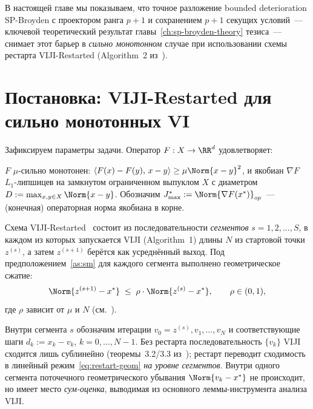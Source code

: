 В настоящей главе мы показываем, что точное разложение bounded
deterioration SP-Broyden с проектором ранга $p{+}1$ и сохранением $p{+}1$
секущих условий~--- ключевой теоретический результат
главы~\ref{ch:sp-broyden-theory} тезиса~--- снимает этот барьер
в \emph{сильно монотонном} случае при использовании схемы рестарта
VIJI-Restarted (Algorithm~2 из~\cite{Agafonov2024VIJI}).

\section{Постановка: VIJI-Restarted для сильно монотонных VI}
\label{sec:viji:setup}

Зафиксируем параметры задачи. Оператор $F: X \to \RR^d$ удовлетворяет:

\begin{assumption}
\label{as:sm}
$F$ $\mu$-сильно монотонен: $\langle F(x) - F(y),\, x-y\rangle \ge \mu\Norm{x-y}^2$,
и якобиан $\nabla F$ $L_1$-липшицев на замкнутом ограниченном выпуклом $X$
с диаметром $D := \max_{x,y\in X}\Norm{x-y}$. Обозначим
$J^{*}_{\max} := \Norm{\nabla F(x^{*})}_{op}$~--- (конечная) операторная норма
якобиана в корне.
\end{assumption}

Схема VIJI-Restarted~\cite[Algorithm~2]{Agafonov2024VIJI} состоит из
последовательности \emph{сегментов} $s = 1, 2, \ldots, S$, в каждом из которых
запускается VIJI (Algorithm~1) длины $N$ из стартовой точки $z^{(s)}$, а затем
$z^{(s+1)}$ берётся как усреднённый выход. Под предположением~\ref{as:sm} для
каждого сегмента выполнено геометрическое сжатие:
\begin{equation}
\Norm{z^{(s+1)} - x^{*}} \;\le\; \rho \cdot \Norm{z^{(s)} - x^{*}},
\qquad \rho \in (0, 1),
\label{eq:restart-geom}
\end{equation}
где $\rho$ зависит от $\mu$ и $N$ (см.~\cite[Theorem~4.2]{Agafonov2024VIJI}).

Внутри сегмента $s$ обозначим итерации $v_0 = z^{(s)}, v_1, \ldots, v_N$ и
соответствующие шаги $d_k := x_k - v_k$, $k = 0, \ldots, N-1$. Без рестарта
последовательность $\{v_k\}$ VIJI сходится лишь сублинейно
(теоремы~3.2/3.3 из~\cite{Agafonov2024VIJI}); рестарт переводит сходимость
в линейный режим~\eqref{eq:restart-geom} \emph{на уровне сегментов}.
Внутри одного сегмента поточечного геометрического убывания $\Norm{v_k-x^{*}}$
не происходит, но имеет место \emph{сум-оценка}, выводимая из основного
леммы-инструмента анализа VIJI.

